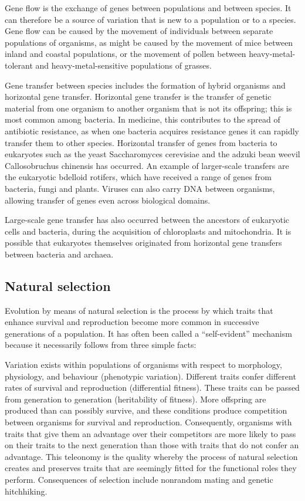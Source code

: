 Gene flow is the exchange of genes between populations and between species. It can therefore be a source of variation that is new to a population or to a species. Gene flow can be caused by the movement of individuals between separate populations of organisms, as might be caused by the movement of mice between inland and coastal populations, or the movement of pollen between heavy-metal-tolerant and heavy-metal-sensitive populations of grasses.

Gene transfer between species includes the formation of hybrid organisms and horizontal gene transfer. Horizontal gene transfer is the transfer of genetic material from one organism to another organism that is not its offspring; this is most common among bacteria. In medicine, this contributes to the spread of antibiotic resistance, as when one bacteria acquires resistance genes it can rapidly transfer them to other species. Horizontal transfer of genes from bacteria to eukaryotes such as the yeast Saccharomyces cerevisiae and the adzuki bean weevil Callosobruchus chinensis has occurred. An example of larger-scale transfers are the eukaryotic bdelloid rotifers, which have received a range of genes from bacteria, fungi and plants. Viruses can also carry DNA between organisms, allowing transfer of genes even across biological domains.

Large-scale gene transfer has also occurred between the ancestors of eukaryotic cells and bacteria, during the acquisition of chloroplasts and mitochondria. It is possible that eukaryotes themselves originated from horizontal gene transfers between bacteria and archaea.

\hypertarget{natural-selection}{%
\subsection{Natural selection}\label{natural-selection}}

Evolution by means of natural selection is the process by which traits that enhance survival and reproduction become more common in successive generations of a population. It has often been called a ``self-evident'' mechanism because it necessarily follows from three simple facts:

Variation exists within populations of organisms with respect to morphology, physiology, and behaviour (phenotypic variation).
Different traits confer different rates of survival and reproduction (differential fitness).
These traits can be passed from generation to generation (heritability of fitness).
More offspring are produced than can possibly survive, and these conditions produce competition between organisms for survival and reproduction. Consequently, organisms with traits that give them an advantage over their competitors are more likely to pass on their traits to the next generation than those with traits that do not confer an advantage. This teleonomy is the quality whereby the process of natural selection creates and preserves traits that are seemingly fitted for the functional roles they perform. Consequences of selection include nonrandom mating and genetic hitchhiking.

